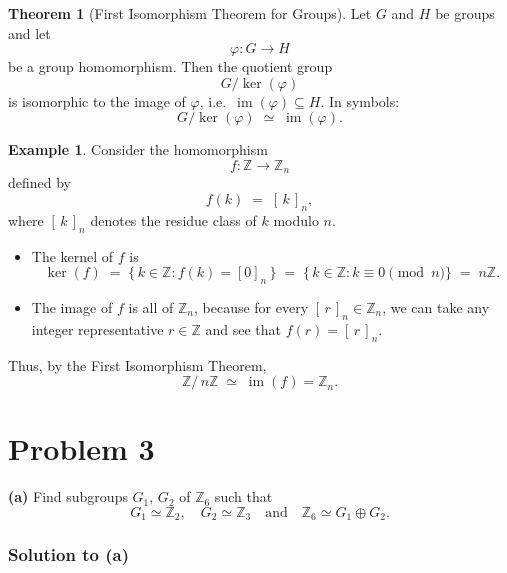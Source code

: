 \documentclass[12pt]{article}
\theoremstyle{definition} %
\newtheorem{theorem}{Theorem}
\newtheorem{example}{Example}
\theoremstyle{plain} %
\begin{document}
\begin{theorem}[First Isomorphism Theorem for Groups]
Let $G$ and $H$ be groups and let 
\[
  \varphi : G \longrightarrow H
\]
be a group homomorphism. Then the quotient group
\[
  G/\ker(\varphi)
\]
is isomorphic to the image of $\varphi$, i.e.\ $\operatorname{im}(\varphi) \subseteq H$. 
In symbols:
\[
  G/\ker(\varphi) \;\simeq\; \operatorname{im}(\varphi).
\]
\end{theorem}

\begin{example}
Consider the homomorphism 
\[
  f : \mathbb{Z} \longrightarrow \mathbb{Z}_n
\]
defined by 
\[
  f(k) \;=\; [\,k\,]_n,
\]
where $[\,k\,]_n$ denotes the residue class of $k$ modulo $n$. 

\begin{itemize}
  \item The kernel of $f$ is 
  \[
    \ker(f) \;=\; \{\,k \in \mathbb{Z} : f(k) = [0]_n\,\}
    \;=\; \{\,k \in \mathbb{Z} : k \equiv 0 \pmod{n}\}
    \;=\; n\mathbb{Z}.
  \]

  \item The image of $f$ is all of $\mathbb{Z}_n$, because for every $[\,r\,]_n \in \mathbb{Z}_n$, we can take any integer representative $r \in \mathbb{Z}$ and see that 
  $f(r) = [\,r\,]_n$.

\end{itemize}

Thus, by the First Isomorphism Theorem,
\[
  \mathbb{Z}/\,n\mathbb{Z} \;\simeq\; \operatorname{im}(f) = \mathbb{Z}_n.
\]
\end{example}

\section*{Problem 3}

\noindent\textbf{(a)} Find subgroups $G_1,\, G_2$ of $\mathbb{Z}_6$ such that 
\[
  G_1 \simeq \mathbb{Z}_2,\quad
  G_2 \simeq \mathbb{Z}_3
  \quad\text{and}\quad
  \mathbb{Z}_6 \simeq G_1 \oplus G_2.
\]

\subsubsection*{Solution to (a)}
\end{document}
